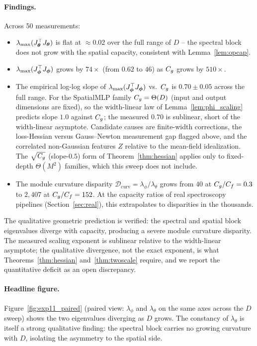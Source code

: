 \paragraph{Findings.} Across 50 measurements:
\begin{itemize}
    \item $\lambda_{\max}(J_{\boldsymbol{\theta}}^\top J_{\boldsymbol{\theta}})$ is flat at
          $\approx 0.02$ over the full range of $D$ -- the spectral
          block does not grow with the spatial capacity, consistent
          with Lemma~\ref{lem:opcap}.
    \item $\lambda_{\max}(J_{\boldsymbol{\phi}}^\top J_{\boldsymbol{\phi}})$ grows by $74\times$
          (from $0.62$ to $46$) as $C_g$ grows by $510\times$.
    \item The empirical log-log slope of $\lambda_{\max}(J_{\boldsymbol{\phi}}^\top
          J_{\boldsymbol{\phi}})$ vs.\ $C_g$ is $0.70 \pm 0.05$ across the full
          range. For the SpatialMLP family $C_g = \Theta(D)$ (input
          and output dimensions are fixed), so the width-linear law
          of Lemma~\ref{lem:phi_scaling} predicts slope $1.0$
          against $C_g$; the measured $0.70$ is sublinear, short of
          the width-linear asymptote. Candidate causes are
          finite-width corrections, the loss-Hessian versus
          Gauss--Newton measurement gap flagged above, and the
          correlated non-Gaussian features $Z$ relative to the
          mean-field idealization. The $\sqrt{C_g}$ (slope-$0.5$)
          form of Theorem~\ref{thm:hessian} applies only to
          fixed-depth $\Theta(M^2)$ families, which this sweep does
          not include.
    \item The module curvature disparity
          $\mathcal{D}_{\mathrm{curv}} = \lambda_\phi / \lambda_\theta$
          grows from $40$ at $C_g/C_f = 0.3$ to $2{,}407$ at
          $C_g/C_f = 152$. At the capacity ratios of real
          spectroscopy pipelines (Section~\ref{sec:real}), this
          extrapolates to disparities in the thousands.
\end{itemize}

The qualitative geometric prediction is verified: the spectral and
spatial block eigenvalues diverge with capacity, producing a severe
module curvature disparity. The measured scaling exponent is
sublinear relative to the width-linear asymptote; the qualitative
divergence, not the exact exponent, is what
Theorems~\ref{thm:hessian} and~\ref{thm:twoscale} require, and we
report the quantitative deficit as an open discrepancy.

\paragraph{Headline figure.}
Figure~\ref{fig:exp11_paired} (paired view: $\lambda_\phi$ and
$\lambda_\theta$ on the same axes across the $D$ sweep) shows the two
eigenvalues diverging as $D$ grows. The constancy of $\lambda_\theta$
is itself a strong qualitative finding: the spectral block carries no
growing curvature with $D$, isolating the asymmetry to the spatial side.

